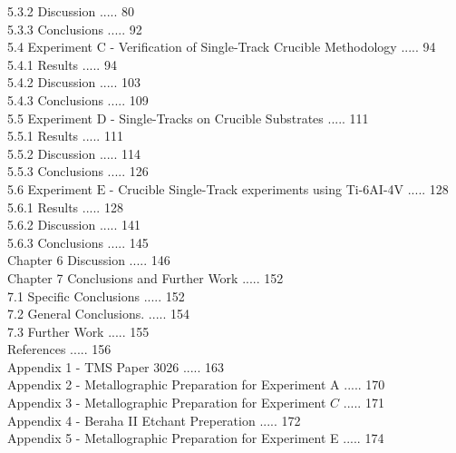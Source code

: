 \documentclass[10pt]{article}
\begin{document}
5.3.2 Discussion ..... 80\\
5.3.3 Conclusions ..... 92\\
5.4 Experiment C - Verification of Single-Track Crucible Methodology ..... 94\\
5.4.1 Results ..... 94\\
5.4.2 Discussion ..... 103\\
5.4.3 Conclusions ..... 109\\
5.5 Experiment D - Single-Tracks on Crucible Substrates ..... 111\\
5.5.1 Results ..... 111\\
5.5.2 Discussion ..... 114\\
5.5.3 Conclusions ..... 126\\
5.6 Experiment $\mathrm{E}$ - Crucible Single-Track experiments using Ti-6AI-4V ..... 128\\
5.6.1 Results ..... 128\\
5.6.2 Discussion ..... 141\\
5.6.3 Conclusions ..... 145\\
Chapter 6 Discussion ..... 146\\
Chapter 7 Conclusions and Further Work ..... 152\\
7.1 Specific Conclusions ..... 152\\
7.2 General Conclusions. ..... 154\\
7.3 Further Work ..... 155\\
References ..... 156\\
Appendix 1 - TMS Paper 3026 ..... 163\\
Appendix 2 - Metallographic Preparation for Experiment A ..... 170\\
Appendix 3 - Metallographic Preparation for Experiment $C$ ..... 171\\
Appendix 4 - Beraha II Etchant Preperation ..... 172\\
Appendix 5 - Metallographic Preparation for Experiment E ..... 174
\end{document}
